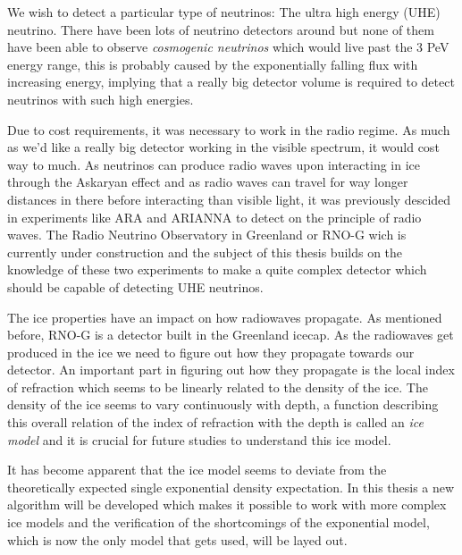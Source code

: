 \documentclass[11pt,a4paper,faculty=we,language=en,doctype=report]{cls/ugent-doc}
\begin{document}
We wish to detect a particular type of neutrinos: The ultra high energy (UHE)
neutrino.  There have been lots of neutrino detectors around but none of them
have been able to observe \textit{cosmogenic neutrinos} which would live past
the 3 PeV energy range, this is probably caused by the exponentially falling
flux with increasing energy, implying that a really big detector volume is
required to detect neutrinos with such high energies. 

Due to cost requirements, it was necessary to work in the radio regime.  As
much as we'd like a really big detector working in the visible spectrum, it
would cost way to much. As neutrinos can produce radio waves upon interacting
in ice through the Askaryan effect and as radio waves can travel for way longer
distances in there before interacting than visible light, it was previously
descided in experiments like ARA and ARIANNA to detect on the principle of
radio waves. The Radio Neutrino Observatory in Greenland or RNO-G wich is
currently under construction and the subject of this thesis builds on the
knowledge of these two experiments to make a quite complex detector which
should be capable of detecting UHE neutrinos.

The ice properties have an impact on how radiowaves propagate. As mentioned before, RNO-G is a detector built
in the Greenland icecap. As the radiowaves get produced in the ice we need to figure out how
they propagate towards our detector. An important part in figuring out how they propagate is 
the local index of refraction which seems to be linearly related to the density of the ice. 
The density of the ice seems to vary continuously with depth, a function describing
this overall relation of the index of refraction with the depth is called an \textit{ice model}
and it is crucial for future studies to understand this ice model.

It has become apparent that the ice model seems to deviate from the
theoretically expected single exponential density expectation.  In this thesis
a new algorithm will be developed which makes it possible to work with more
complex ice models and the verification of the shortcomings of the exponential
model, which is now the only model that gets used, will be layed out.

{\hypersetup{hidelinks}\tableofcontents} %
\newpage


\end{document}
